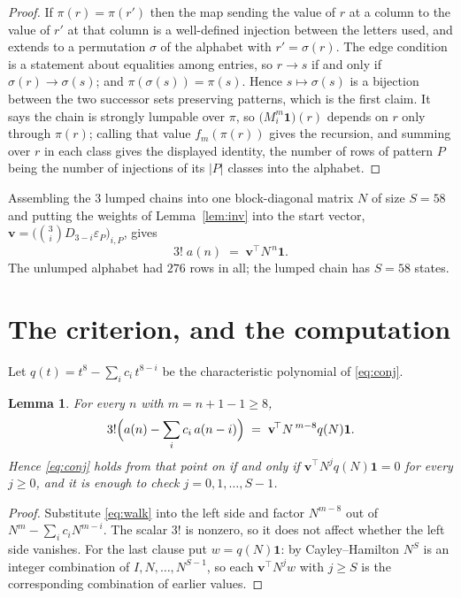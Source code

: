\documentclass[11pt,a4paper]{article}
\theoremstyle{plain}
\newtheorem{lemma}[theorem]{Lemma}
\theoremstyle{definition}
\begin{document}
\begin{proof}
If $\pi(r)=\pi(r')$ then the map sending the value of $r$ at a column to the value of $r'$
at that column is a well-defined injection between the letters used, and extends to a
permutation $\sigma$ of the alphabet with $r'=\sigma(r)$. The edge condition is a statement
about equalities among entries, so $r\to s$ if and only if $\sigma(r)\to\sigma(s)$; and
$\pi(\sigma(s))=\pi(s)$. Hence $s\mapsto\sigma(s)$ is a bijection between the two successor
sets preserving patterns, which is the first claim. It says the chain is strongly lumpable
over $\pi$, so $\bigl(M_i^{m}\mathbf{1}\bigr)(r)$ depends on $r$ only through $\pi(r)$;
calling that value $f_m(\pi(r))$ gives the recursion, and summing over $r$ in each class
gives the displayed identity, the number of rows of pattern $P$ being the number of
injections of its $|P|$ classes into the alphabet.
\end{proof}

Assembling the $3$ lumped chains into one block-diagonal matrix $N$ of size $S=58$ and
putting the weights of Lemma~\ref{lem:inv} into the start vector,
$\mathbf{v}=\bigl(\binom{3}{i}D_{3-i}\varepsilon_P\bigr)_{i,P}$, gives
\begin{equation}\label{eq:walk}
3!\;a(n)\;=\;\mathbf{v}^{\!\top}N^{\,n}\mathbf{1} .
\end{equation}
The unlumped alphabet had $276$ rows in all; the lumped chain has $S=58$ states.

\section{The criterion, and the computation}

Let $q(t)=t^{8}-\sum_i c_i\,t^{8-i}$ be the characteristic polynomial of
\eqref{eq:conj}.

\begin{lemma}\label{lem:crit}
For every $n$ with $m=n+1-1\ge8$,
\[
3!\Bigl(a(n)-\sum_i c_i\,a(n-i)\Bigr)\;=\;\mathbf{v}^{\!\top}N^{\,m-8}q(N)\mathbf{1} .
\]
Hence \eqref{eq:conj} holds from that point on if and only if
$\mathbf{v}^{\!\top}N^{j}q(N)\mathbf{1}=0$ for every $j\ge0$, and it is enough to check
$j=0,1,\dots,S-1$.
\end{lemma}

\begin{proof}
Substitute \eqref{eq:walk} into the left side and factor $N^{m-8}$ out of
$N^{m}-\sum_i c_iN^{m-i}$. The scalar $3!$ is nonzero, so it does not affect whether
the left side vanishes. For the last clause put $w=q(N)\mathbf{1}$: by Cayley--Hamilton
$N^{S}$ is an integer combination of $I,N,\dots,N^{S-1}$, so each
$\mathbf{v}^{\!\top}N^{j}w$ with $j\ge S$ is the corresponding combination of earlier
values.
\end{proof}
\end{document}
